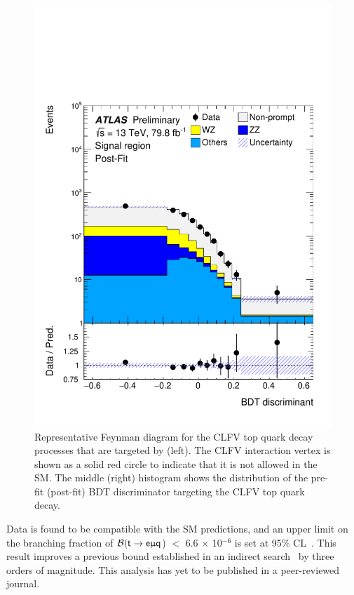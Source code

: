 \begin{figure}[tbh!]
\begin{center}
\begin{minipage}[b]{0.325\linewidth}
 \end{minipage}
 \hfill
 \begin{minipage}[b]{0.325\linewidth} 
 \includegraphics[width=\textwidth]{figures/Part3/History/ATLAS_results2}
 \end{minipage}
 \caption{Representative Feynman diagram for the \ac{CLFV} top quark decay processes that are targeted by \cite{ATLAS-CONF-2018-044} (left). The \ac{CLFV} interaction vertex is shown as a solid red circle to indicate that it is not allowed in the \ac{SM}. The middle (right) histogram shows the distribution of the pre-fit (post-fit) \ac{BDT} discriminator targeting the \ac{CLFV} top quark decay. }
 \label{fig:ATLAS_results1}
 \end{center}
\end{figure}

Data is found to be compatible with the \ac{SM} predictions, and an upper limit on the branching fraction of $\mathcal{B}(\textsf{t}\rightarrow\textsf{e}\upmu\textsf{q}$) $<$ 6.6 $\times$ 10$^{-6}$ is set at 95\% \ac{CL}~\cite{Read2002}. This result improves a previous bound established in an indirect search~\cite{Davidson:2015zza} by three orders of magnitude. This analysis has yet to be published in a peer-reviewed journal. 

